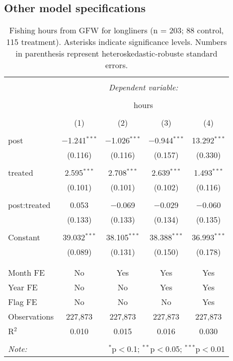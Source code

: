 \documentclass[11pt,]{article}
\begin{document}
\hypertarget{other-model-specifications}{%
\subsection{Other model
specifications}\label{other-model-specifications}}

\begin{table}[!htbp] \centering 
  \caption{\label{tab:long}Fishing hours from GFW for longliners (n = 203; 88 control, 115 treatment). Asterisks indicate significance levels. Numbers in parenthesis represent heteroskedastic-robuste standard errors.} 
  \label{} 
\begin{tabular}{@{\extracolsep{5pt}}lcccc} 
\\[-1.8ex]\hline 
\hline \\[-1.8ex] 
 & \multicolumn{4}{c}{\textit{Dependent variable:}} \\ 
\cline{2-5} 
\\[-1.8ex] & \multicolumn{4}{c}{hours} \\ 
\\[-1.8ex] & (1) & (2) & (3) & (4)\\ 
\hline \\[-1.8ex] 
 post & $-$1.241$^{***}$ & $-$1.026$^{***}$ & $-$0.944$^{***}$ & 13.292$^{***}$ \\ 
  & (0.116) & (0.116) & (0.157) & (0.330) \\ 
  & & & & \\ 
 treated & 2.595$^{***}$ & 2.708$^{***}$ & 2.639$^{***}$ & 1.493$^{***}$ \\ 
  & (0.101) & (0.101) & (0.102) & (0.116) \\ 
  & & & & \\ 
 post:treated & 0.053 & $-$0.069 & $-$0.029 & $-$0.060 \\ 
  & (0.133) & (0.133) & (0.134) & (0.135) \\ 
  & & & & \\ 
 Constant & 39.032$^{***}$ & 38.105$^{***}$ & 38.388$^{***}$ & 36.993$^{***}$ \\ 
  & (0.089) & (0.131) & (0.150) & (0.178) \\ 
  & & & & \\ 
\hline \\[-1.8ex] 
Month FE & No & Yes & Yes & Yes \\ 
Year FE & No & No & Yes & Yes \\ 
Flag FE & No & No & No & Yes \\ 
Observations & 227,873 & 227,873 & 227,873 & 227,873 \\ 
R$^{2}$ & 0.010 & 0.015 & 0.016 & 0.030 \\ 
\hline 
\hline \\[-1.8ex] 
\textit{Note:}  & \multicolumn{4}{r}{$^{*}$p$<$0.1; $^{**}$p$<$0.05; $^{***}$p$<$0.01} \\ 
\end{tabular} 
\end{table}
\end{document}
